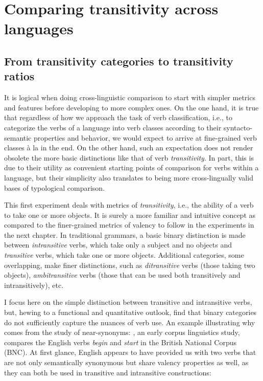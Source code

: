 \chapter{Comparing transitivity across languages}\label{chapter:transitivity}

\section{From transitivity categories to transitivity ratios}

It is logical when doing cross-linguistic comparison to start with simpler metrics and features before developing to more complex ones. On the one hand, it is true that regardless of how we approach the task of verb classification, i.e., to categorize the verbs of a language into verb classes according to their syntacto-semantic properties and behavior, we would expect to arrive at fine-grained verb classes à la \citet{levin1993} in the end. On the other hand, such an expectation does not render obsolete the more basic distinctions like that of verb \textit{transitivity}. In part, this is due to their utility as convenient starting points of comparison for verbs within a language, but their simplicity also translates to being more cross-lingually valid bases of typological comparison. 

This first experiment deals with metrics of \textit{transitivity}, i.e., the ability of a verb to take one or more objects. It is surely a more familiar and intuitive concept as compared to the finer-grained metrics of valency to follow in the experiments in the next chapter. In traditional grammars, a basic binary distinction is made between \textit{intransitive} verbs, which take only a subject and no objects and \textit{transitive} verbs, which take one or more objects. Additional categories, some overlapping, make finer distinctions, such as \textit{ditransitive} verbs (those taking two objects), \textit{ambitransitive} verbs (those that can be used both transitively and intransitively), etc.

I focus here on the simple distinction between transitive and intransitive verbs, but, hewing to a functional and quantitative outlook, find that binary categories do not sufficiently capture the nuances of verb use. An example illustrating why comes from the study of near-synonyms: \citep{biber1998}, an early corpus linguistics study, compares the English verbs \textit{begin} and \textit{start} in the British National Corpus (BNC). At first glance, English appears to have provided us with two verbs that are not only semantically synonymous but share valency properties as well, as they can both be used in transitive and intransitive constructions:

